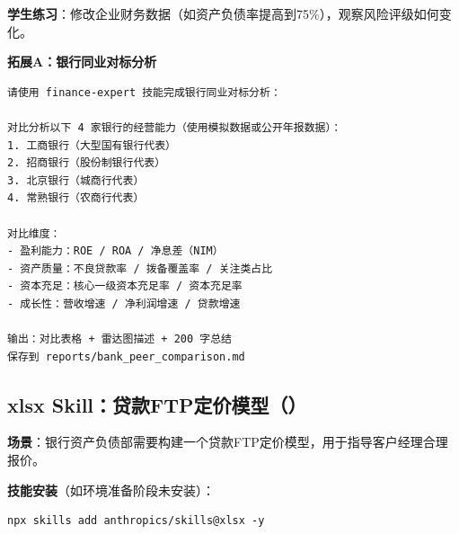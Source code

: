 \textbf{学生练习}：修改企业财务数据（如资产负债率提高到75\%），观察风险评级如何变化。

\textbf{拓展A：银行同业对标分析}

\begin{lstlisting}
请使用 finance-expert 技能完成银行同业对标分析：

对比分析以下 4 家银行的经营能力（使用模拟数据或公开年报数据）：
1. 工商银行（大型国有银行代表）
2. 招商银行（股份制银行代表）
3. 北京银行（城商行代表）
4. 常熟银行（农商行代表）

对比维度：
- 盈利能力：ROE / ROA / 净息差（NIM）
- 资产质量：不良贷款率 / 拨备覆盖率 / 关注类占比
- 资本充足：核心一级资本充足率 / 资本充足率
- 成长性：营收增速 / 净利润增速 / 贷款增速

输出：对比表格 + 雷达图描述 + 200 字总结
保存到 reports/bank_peer_comparison.md
\end{lstlisting}

\subsection{xlsx Skill：贷款FTP定价模型（）}

\textbf{场景}：银行资产负债部需要构建一个贷款FTP定价模型，用于指导客户经理合理报价。

\textbf{技能安装}（如环境准备阶段未安装）：

\begin{lstlisting}[style=shell]
npx skills add anthropics/skills@xlsx -y
\end{lstlisting}

